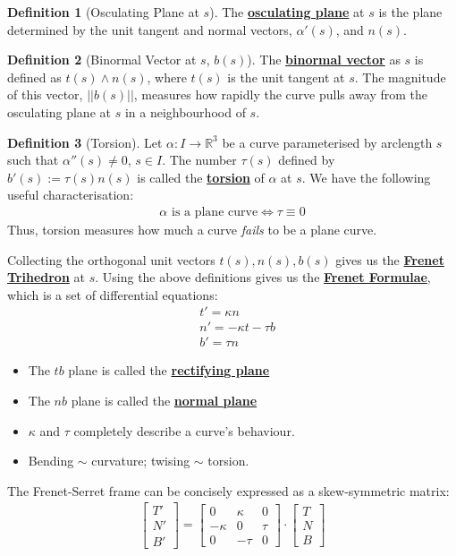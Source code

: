 \documentclass[11pt]{scrartcl}
\newcommand{\R}[0]{\mathbb{R}}
\theoremstyle{definition}
\newtheorem{definition}{Definition}
\theoremstyle{remark}
\newcommand{\dfn}[1]{\textbf{\underline{#1}}}
\begin{document}
{\begin{definition}[Osculating Plane at $s$]
	The \dfn{osculating plane} at $s$ is the plane determined by the unit tangent and normal vectors, $\alpha'(s)$, and $n(s)$. 
\end{definition}

\begin{definition}[Binormal Vector at $s$, $b(s)$] 
	The \dfn{binormal vector} as $s$ is defined as $t(s) \wedge n(s)$, where $t(s)$ is the unit tangent at $s$. The magnitude of this vector, $||b(s)||$, measures how rapidly the curve pulls away from the osculating plane at $s$ in a neighbourhood of $s$. 
\end{definition}

\begin{definition}[Torsion]
	Let $\alpha: I \rightarrow \R^3$ be a curve parameterised by arclength $s$ such that $\alpha''(s) \neq 0$, $s \in I$. The number $\tau(s)$ defined by $b'(s) := \tau(s)  n(s)$ is called the \dfn{torsion} of $\alpha$ at $s$. We have the following useful characterisation: 
	\begin{align*}
		\alpha \text{ is a plane curve} \iff \tau \equiv 0
	\end{align*}
	Thus, torsion measures how much a curve \emph{fails} to be a plane curve. 
\end{definition}

Collecting the orthogonal unit vectors $t(s), n(s), b(s)$ gives us the \dfn{Frenet Trihedron} at $s$. Using the above definitions gives us the \dfn{Frenet Formulae}, which is a set of differential equations: 
\begin{align}
	& t' = \kappa n \\
	& n' = - \kappa t - \tau b \\
	& b' = \tau n 	
\end{align}
\begin{itemize}[noitemsep]
	\item The $tb$ plane is called the \dfn{rectifying plane} 
	\item The $nb$ plane is called the \dfn{normal plane} 
	\item $\kappa$ and $\tau$ completely describe a curve's behaviour. 
	\item Bending $\sim$ curvature; twising $\sim$ torsion. 
\end{itemize}
The Frenet-Serret frame can be concisely expressed as a skew-symmetric matrix: 
\begin{align}
	\begin{bmatrix}
		T' \\
		N ' \\
		B' 
	\end{bmatrix}	 = \begin{bmatrix}
		0 & \kappa & 0 \\
		- \kappa & 0 & \tau \\
		0 & - \tau & 0 
	\end{bmatrix} \cdot \begin{bmatrix}
		T \\
		N \\
		B
	\end{bmatrix}
\end{align}

}
\end{document}
